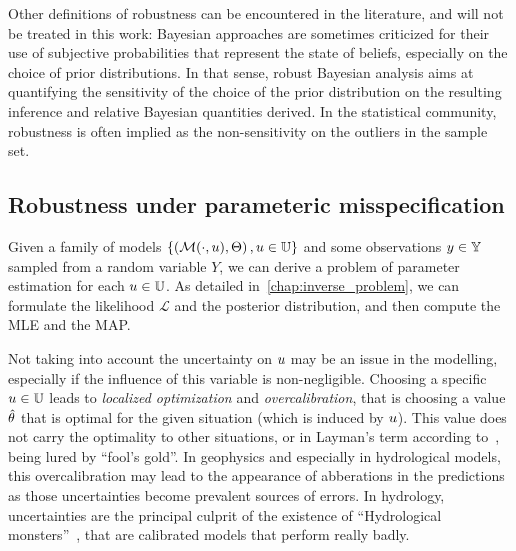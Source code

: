 \documentclass[../../Main_ManuscritThese.tex]{subfiles}
\begin{document}
Other definitions of robustness can be encountered in the literature, and will not be treated in this work: Bayesian approaches are sometimes criticized for their use of subjective probabilities that represent the state of beliefs, especially on the choice of prior distributions. In that sense, robust Bayesian analysis aims at quantifying the sensitivity of the choice of the prior distribution on the resulting inference and relative Bayesian quantities derived. In the statistical community, robustness is often implied as the non-sensitivity on the outliers in the sample set.



\subsection{Robustness under parameteric misspecification}

Given a family of models $\left\{\left(\mathcal{M}(\cdot, u), \Theta\right), u\in\mathbb{U}\right\}$ and some observations $y\in \mathbb{Y}$ sampled from a random variable $Y$, we can derive a problem of parameter estimation for each $u \in \mathbb{U}$. As detailed in~\cref{chap:inverse_problem}, we can formulate the likelihood $\mathcal{L}$ and the posterior distribution, and then compute the MLE and the MAP.



Not taking into account the uncertainty on $u$ may be an issue in the modelling, especially if the influence of this variable is non-negligible.
Choosing a specific $u \in \mathbb{U}$ leads to \emph{localized optimization} \citep{huyse_free-form_2001} and \emph{overcalibration}, that is choosing a value $\hat{\theta}$ that is optimal for the given situation (which is induced by $u$). This value does not carry the optimality to other situations, or in Layman's term according to~\cite{andreassian_all_2012}, being lured by ``fool's gold''.
In geophysics and especially in hydrological models, this overcalibration may lead to the appearance of abberations in the predictions as those uncertainties become prevalent sources of errors. In hydrology, uncertainties are the principal culprit of the existence of  ``Hydrological monsters''~\citep{kuczera_there_2010}, that are calibrated models that perform really badly.
\end{document}
